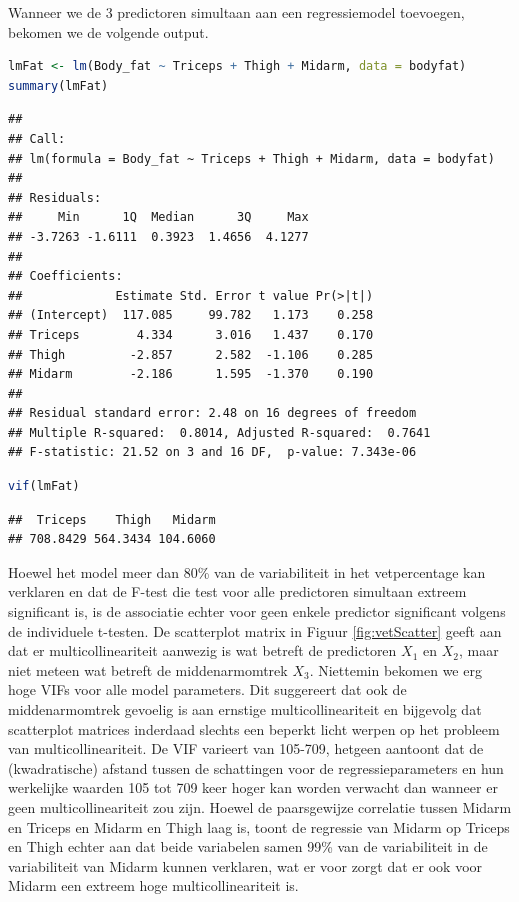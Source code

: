\documentclass[
  12pt,dutch,coursenotes]{book}
\begin{document}
Wanneer we de 3 predictoren simultaan aan een regressiemodel toevoegen, bekomen we de volgende output.

\begin{lstlisting}[language=R]
lmFat <- lm(Body_fat ~ Triceps + Thigh + Midarm, data = bodyfat)
summary(lmFat)
\end{lstlisting}

\begin{lstlisting}
## 
## Call:
## lm(formula = Body_fat ~ Triceps + Thigh + Midarm, data = bodyfat)
## 
## Residuals:
##     Min      1Q  Median      3Q     Max 
## -3.7263 -1.6111  0.3923  1.4656  4.1277 
## 
## Coefficients:
##             Estimate Std. Error t value Pr(>|t|)
## (Intercept)  117.085     99.782   1.173    0.258
## Triceps        4.334      3.016   1.437    0.170
## Thigh         -2.857      2.582  -1.106    0.285
## Midarm        -2.186      1.595  -1.370    0.190
## 
## Residual standard error: 2.48 on 16 degrees of freedom
## Multiple R-squared:  0.8014, Adjusted R-squared:  0.7641 
## F-statistic: 21.52 on 3 and 16 DF,  p-value: 7.343e-06
\end{lstlisting}

\begin{lstlisting}[language=R]
vif(lmFat)
\end{lstlisting}

\begin{lstlisting}
##  Triceps    Thigh   Midarm 
## 708.8429 564.3434 104.6060
\end{lstlisting}

Hoewel het model meer dan 80\% van de variabiliteit in het vetpercentage kan verklaren en dat de F-test die test voor alle predictoren simultaan extreem significant is, is de associatie echter voor geen enkele predictor significant volgens de individuele t-testen.
De scatterplot matrix in Figuur \ref{fig:vetScatter} geeft aan dat er multicollineariteit aanwezig is wat betreft de predictoren \(X_1\) en \(X_2\), maar niet meteen wat betreft de middenarmomtrek \(X_3\). Niettemin bekomen we erg hoge VIFs voor alle model parameters.
Dit suggereert dat ook de middenarmomtrek gevoelig is aan ernstige multicollineariteit en bijgevolg dat scatterplot matrices inderdaad slechts een beperkt licht werpen op het probleem van multicollineariteit.
De VIF varieert van 105-709, hetgeen aantoont dat de (kwadratische) afstand tussen de schattingen voor de regressieparameters en hun werkelijke waarden 105 tot 709 keer hoger kan worden verwacht dan wanneer er geen multicollineariteit zou zijn.
Hoewel de paarsgewijze correlatie tussen Midarm en Triceps en Midarm en Thigh laag is, toont de regressie van Midarm op Triceps en Thigh echter aan dat beide variabelen samen 99\% van de variabiliteit in de variabiliteit van Midarm kunnen verklaren, wat er voor zorgt dat er ook voor Midarm een extreem hoge multicollineariteit is.
\end{document}
